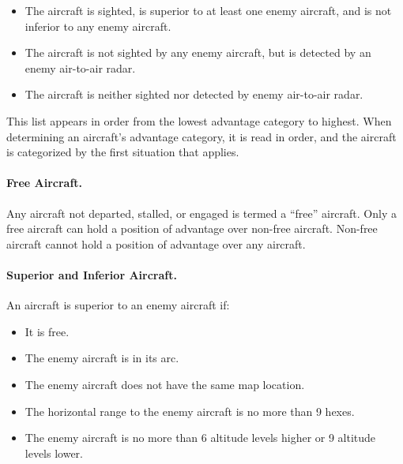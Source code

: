 {\begin{itemize}
    \item{} 
    The aircraft is sighted, is superior to at least one enemy aircraft, and is not inferior to any enemy aircraft.

    \item{} The aircraft is not sighted by any enemy aircraft, but is detected by an enemy air-to-air radar.

    \item{} The aircraft is neither sighted nor detected by enemy air-to-air radar.

\end{itemize}

\Ax{
    
}

This list appears in order from the lowest advantage category to highest. When determining an aircraft’s advantage category, it is read in order, and the aircraft is categorized by the first situation that applies. 

\paragraph{Free Aircraft.} Any aircraft not departed, stalled, or engaged is termed a “free” aircraft. Only a free aircraft can hold a position of advantage over non-free aircraft. Non-free aircraft cannot hold a position of advantage over any aircraft.


\paragraph{Superior and Inferior Aircraft.} An aircraft is superior to an enemy aircraft if:
\begin{itemize}
    \item It is free.
    \item The enemy aircraft is in its  arc.
    \item The enemy aircraft does not have the same map location.
    \item The horizontal range to the enemy aircraft is no more than 9 hexes.
    \item The enemy aircraft is no more than 6 altitude levels higher or 9 altitude levels lower.
\end{itemize}

}
